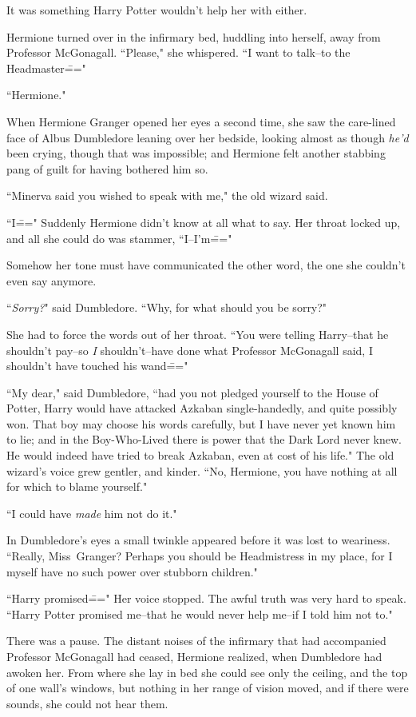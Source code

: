 It was something Harry Potter wouldn't help her with either.

Hermione turned over in the infirmary bed, huddling into herself, away from Professor McGonagall. ``Please," she whispered. ``I want to talk\---to the Headmaster\==="

\later

``Hermione."

When Hermione Granger opened her eyes a second time, she saw the care-lined face of Albus Dumbledore leaning over her bedside, looking almost as though \emph{he'd} been crying, though that was impossible; and Hermione felt another stabbing pang of guilt for having bothered him so.

``Minerva said you wished to speak with me," the old wizard said.

``I\===" Suddenly Hermione didn't know at all what to say. Her throat locked up, and all she could do was stammer, ``I\---I'm\==="

Somehow her tone must have communicated the other word, the one she couldn't even say anymore.

``\emph{Sorry?}" said Dumbledore. ``Why, for what should you be sorry?"

She had to force the words out of her throat. ``You were telling Harry\---that he shouldn't pay\---so \emph{I} shouldn't\---have done what Professor McGonagall said, I shouldn't have touched his wand\==="

``My dear," said Dumbledore, ``had you not pledged yourself to the House of Potter, Harry would have attacked Azkaban single-handedly, and quite possibly won. That boy may choose his words carefully, but I have never yet known him to lie; and in the Boy-Who-Lived there is power that the Dark Lord never knew. He would indeed have tried to break Azkaban, even at cost of his life." The old wizard's voice grew gentler, and kinder. ``No, Hermione, you have nothing at all for which to blame yourself."

``I could have \emph{made} him not do it."

In Dumbledore's eyes a small twinkle appeared before it was lost to weariness. ``Really, Miss~Granger? Perhaps you should be Headmistress in my place, for I myself have no such power over stubborn children."

``Harry promised\===" Her voice stopped. The awful truth was very hard to speak. ``Harry Potter promised me\---that he would never help me\---if I told him not to."

There was a pause. The distant noises of the infirmary that had accompanied Professor McGonagall had ceased, Hermione realized, when Dumbledore had awoken her. From where she lay in bed she could see only the ceiling, and the top of one wall's windows, but nothing in her range of vision moved, and if there were sounds, she could not hear them.

